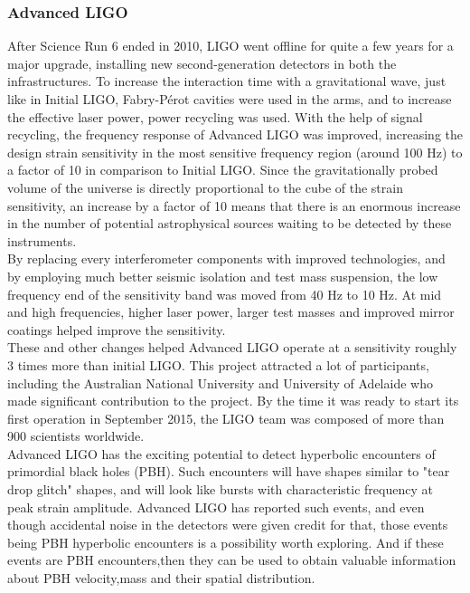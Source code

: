 \subsubsection{Advanced LIGO}
After Science Run 6 ended in 2010, LIGO went offline for quite a few years for a major upgrade, installing new second-generation detectors in both the infrastructures. To increase the interaction time with a gravitational wave, just like in Initial LIGO, Fabry-P\'erot cavities were used in the arms, and to increase the effective laser power, power recycling was used. With the help of signal recycling, the frequency response of Advanced LIGO was improved, increasing the design strain sensitivity in the most sensitive frequency region (around 100 Hz) to a factor of 10 in comparison to Initial LIGO. Since the gravitationally probed volume of the universe is directly proportional to the cube of the strain sensitivity, an increase by a factor of 10 means that there is an enormous increase in the number of potential astrophysical sources waiting to be detected by these instruments.\\

By replacing every interferometer components with improved technologies, and by employing much better seismic isolation and test mass suspension, the low frequency end of the sensitivity band was moved from 40 Hz to 10 Hz. At mid and high frequencies, higher laser power, larger test masses and improved mirror coatings helped improve the sensitivity. \cite{Adv_LIGO_Paper}\\ 

These and other changes helped Advanced LIGO operate at a sensitivity roughly 3 times more than initial LIGO. This project attracted a lot of participants, including the Australian National University and University of Adelaide who made significant contribution to the project. By the time it was ready to start its first operation in September 2015, the LIGO team was composed of more than 900 scientists worldwide. \cite{Adv_LIGO}\\

Advanced LIGO has the exciting potential to detect hyperbolic encounters of primordial black holes (PBH). Such encounters will have shapes similar to "tear drop glitch" shapes, and will look like bursts with characteristic frequency at peak strain amplitude. Advanced LIGO has reported such events, and even though accidental noise in the detectors were given credit for that, those events being PBH hyperbolic encounters is a possibility worth exploring. And if these events are PBH encounters,then they can be used to obtain valuable information about PBH velocity,mass and their spatial distribution. \cite{Garc_a_Bellido_2017}

